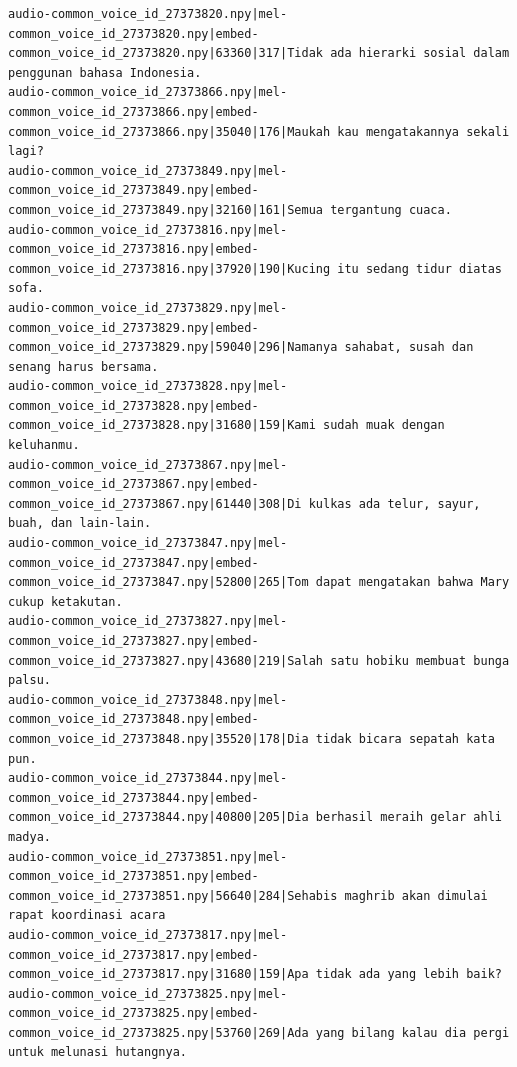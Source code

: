 \begin{enumerate}
\begin{lstlisting}[caption=Beberapa Data Pada File train.txt]
audio-common_voice_id_27373820.npy|mel-common_voice_id_27373820.npy|embed-common_voice_id_27373820.npy|63360|317|Tidak ada hierarki sosial dalam penggunan bahasa Indonesia.
audio-common_voice_id_27373866.npy|mel-common_voice_id_27373866.npy|embed-common_voice_id_27373866.npy|35040|176|Maukah kau mengatakannya sekali lagi?
audio-common_voice_id_27373849.npy|mel-common_voice_id_27373849.npy|embed-common_voice_id_27373849.npy|32160|161|Semua tergantung cuaca.
audio-common_voice_id_27373816.npy|mel-common_voice_id_27373816.npy|embed-common_voice_id_27373816.npy|37920|190|Kucing itu sedang tidur diatas sofa.
audio-common_voice_id_27373829.npy|mel-common_voice_id_27373829.npy|embed-common_voice_id_27373829.npy|59040|296|Namanya sahabat, susah dan senang harus bersama.
audio-common_voice_id_27373828.npy|mel-common_voice_id_27373828.npy|embed-common_voice_id_27373828.npy|31680|159|Kami sudah muak dengan keluhanmu.
audio-common_voice_id_27373867.npy|mel-common_voice_id_27373867.npy|embed-common_voice_id_27373867.npy|61440|308|Di kulkas ada telur, sayur, buah, dan lain-lain.
audio-common_voice_id_27373847.npy|mel-common_voice_id_27373847.npy|embed-common_voice_id_27373847.npy|52800|265|Tom dapat mengatakan bahwa Mary cukup ketakutan.
audio-common_voice_id_27373827.npy|mel-common_voice_id_27373827.npy|embed-common_voice_id_27373827.npy|43680|219|Salah satu hobiku membuat bunga palsu.
audio-common_voice_id_27373848.npy|mel-common_voice_id_27373848.npy|embed-common_voice_id_27373848.npy|35520|178|Dia tidak bicara sepatah kata pun.
audio-common_voice_id_27373844.npy|mel-common_voice_id_27373844.npy|embed-common_voice_id_27373844.npy|40800|205|Dia berhasil meraih gelar ahli madya.
audio-common_voice_id_27373851.npy|mel-common_voice_id_27373851.npy|embed-common_voice_id_27373851.npy|56640|284|Sehabis maghrib akan dimulai rapat koordinasi acara
audio-common_voice_id_27373817.npy|mel-common_voice_id_27373817.npy|embed-common_voice_id_27373817.npy|31680|159|Apa tidak ada yang lebih baik?
audio-common_voice_id_27373825.npy|mel-common_voice_id_27373825.npy|embed-common_voice_id_27373825.npy|53760|269|Ada yang bilang kalau dia pergi untuk melunasi hutangnya.
\end{lstlisting}


\end{enumerate}
